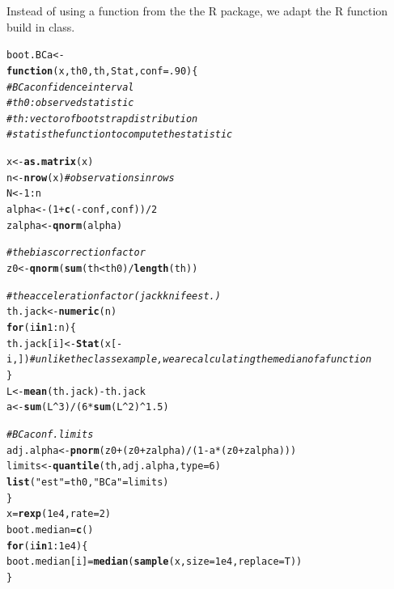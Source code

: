 \documentclass{article}\usepackage[]{graphicx}\usepackage[]{color}
\makeatletter
\newcommand{\hlnum}[1]{\textcolor[rgb]{0.686,0.059,0.569}{#1}}%
\newcommand{\hlstr}[1]{\textcolor[rgb]{0.192,0.494,0.8}{#1}}%
\newcommand{\hlcom}[1]{\textcolor[rgb]{0.678,0.584,0.686}{\textit{#1}}}%
\newcommand{\hlopt}[1]{\textcolor[rgb]{0,0,0}{#1}}%
\newcommand{\hlstd}[1]{\textcolor[rgb]{0.345,0.345,0.345}{#1}}%
\newcommand{\hlkwa}[1]{\textcolor[rgb]{0.161,0.373,0.58}{\textbf{#1}}}%
\newcommand{\hlkwb}[1]{\textcolor[rgb]{0.69,0.353,0.396}{#1}}%
\newcommand{\hlkwc}[1]{\textcolor[rgb]{0.333,0.667,0.333}{#1}}%
\newcommand{\hlkwd}[1]{\textcolor[rgb]{0.737,0.353,0.396}{\textbf{#1}}}%
\newenvironment{kframe}{%
 \def\at@end@of@kframe{}%
 \ifinner\ifhmode%
  \def\at@end@of@kframe{\end{minipage}}%
  \begin{minipage}{\columnwidth}%
 \fi\fi%
 \def\FrameCommand##1{\hskip\@totalleftmargin \hskip-\fboxsep
 \colorbox{shadecolor}{##1}\hskip-\fboxsep
     \hskip-\linewidth \hskip-\@totalleftmargin \hskip\columnwidth}%
 \MakeFramed {\advance\hsize-\width
   \@totalleftmargin\z@ \linewidth\hsize
   \@setminipage}}%
 {\par\unskip\endMakeFramed%
 \at@end@of@kframe}
\newenvironment{knitrout}{}{} %
\makeatother
\begin{document}
Instead of using a function from the the R package, we adapt the R function build in class.
\begin{knitrout}
\color{fgcolor}\begin{kframe}
\begin{alltt}
\hlstd{boot.BCa} \hlkwb{<-}
  \hlkwa{function}\hlstd{(}\hlkwc{x}\hlstd{,} \hlkwc{th0}\hlstd{,} \hlkwc{th}\hlstd{,} \hlkwc{Stat}\hlstd{,} \hlkwc{conf} \hlstd{=} \hlnum{.90}\hlstd{) \{}
    \hlcom{# BCa confidence interval}
    \hlcom{# th0: observed statistic}
    \hlcom{# th: vector of bootstrap distribution}
    \hlcom{# stat is the function to compute the statistic}

    \hlstd{x} \hlkwb{<-} \hlkwd{as.matrix}\hlstd{(x)}
    \hlstd{n} \hlkwb{<-} \hlkwd{nrow}\hlstd{(x)} \hlcom{#observations in rows}
    \hlstd{N} \hlkwb{<-} \hlnum{1}\hlopt{:}\hlstd{n}
    \hlstd{alpha} \hlkwb{<-} \hlstd{(}\hlnum{1} \hlopt{+} \hlkwd{c}\hlstd{(}\hlopt{-}\hlstd{conf, conf))}\hlopt{/}\hlnum{2}
    \hlstd{zalpha} \hlkwb{<-} \hlkwd{qnorm}\hlstd{(alpha)}

    \hlcom{# the bias correction factor}
    \hlstd{z0} \hlkwb{<-} \hlkwd{qnorm}\hlstd{(}\hlkwd{sum}\hlstd{(th} \hlopt{<} \hlstd{th0)} \hlopt{/} \hlkwd{length}\hlstd{(th))}

    \hlcom{# the acceleration factor (jackknife est.)}
    \hlstd{th.jack} \hlkwb{<-} \hlkwd{numeric}\hlstd{(n)}
    \hlkwa{for} \hlstd{(i} \hlkwa{in} \hlnum{1}\hlopt{:}\hlstd{n) \{}
      \hlstd{th.jack[i]} \hlkwb{<-} \hlkwd{Stat}\hlstd{(x[}\hlopt{-}\hlstd{i, ])} \hlcom{#unlike the class example, we are calculating the median of a function }
    \hlstd{\}}
    \hlstd{L} \hlkwb{<-} \hlkwd{mean}\hlstd{(th.jack)} \hlopt{-} \hlstd{th.jack}
    \hlstd{a} \hlkwb{<-} \hlkwd{sum}\hlstd{(L}\hlopt{^}\hlnum{3}\hlstd{)}\hlopt{/}\hlstd{(}\hlnum{6} \hlopt{*} \hlkwd{sum}\hlstd{(L}\hlopt{^}\hlnum{2}\hlstd{)}\hlopt{^}\hlnum{1.5}\hlstd{)}

    \hlcom{# BCa conf. limits}
    \hlstd{adj.alpha} \hlkwb{<-} \hlkwd{pnorm}\hlstd{(z0} \hlopt{+} \hlstd{(z0}\hlopt{+}\hlstd{zalpha)}\hlopt{/}\hlstd{(}\hlnum{1}\hlopt{-}\hlstd{a}\hlopt{*}\hlstd{(z0}\hlopt{+}\hlstd{zalpha)))}
    \hlstd{limits} \hlkwb{<-} \hlkwd{quantile}\hlstd{(th, adj.alpha,} \hlkwc{type}\hlstd{=}\hlnum{6}\hlstd{)}
    \hlkwd{list}\hlstd{(}\hlstr{"est"}\hlstd{=th0,} \hlstr{"BCa"}\hlstd{=limits)}
  \hlstd{\}}
\hlstd{x} \hlkwb{=} \hlkwd{rexp}\hlstd{(}\hlnum{1e4}\hlstd{,} \hlkwc{rate} \hlstd{=} \hlnum{2}\hlstd{)}
\hlstd{boot.median} \hlkwb{=} \hlkwd{c}\hlstd{()}
\hlkwa{for}\hlstd{(i} \hlkwa{in} \hlnum{1}\hlopt{:}\hlnum{1e4}\hlstd{)\{}
  \hlstd{boot.median[i]} \hlkwb{=} \hlkwd{median}\hlstd{(}\hlkwd{sample}\hlstd{(x,} \hlkwc{size} \hlstd{=} \hlnum{1e4}\hlstd{,} \hlkwc{replace} \hlstd{= T))}
  \hlstd{\}}


\end{alltt}
\end{kframe}
\end{knitrout}
\end{document}

